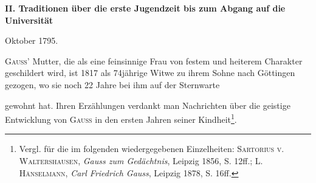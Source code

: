 \bigskip
\begin{center}\bfseries
II. Traditionen über die erste Jugendzeit bis zum Abgang auf die Universität\par
Oktober 1795.
\end{center}
\indent \textsc{Gauss}’ Mutter, die als eine feinsinnige Frau von festem und heiterem
Charakter geschildert wird, ist 1817 als 74jährige Witwe zu ihrem Sohne
nach Göttingen gezogen, wo sie noch 22 Jahre bei ihm auf der Sternwarte\par
{}
\clearpage{}
\noindent gewohnt hat. Ihren Erzählungen verdankt man Nachrichten über die geistige
Entwicklung von \textsc{Gauss} in den ersten Jahren seiner Kindheit\footnote{Vergl. für die im folgenden wiedergegebenen Einzelheiten: \textsc{Sartorius v. Waltershausen}, \textit{Gauss zum Gedächtnis}, Leipzig 1856, S. 12ff.; L. \textsc{Hänselmann}, \textit{Carl Friedrich Gauss}, Leipzig 1878, S. 16ff.}.


